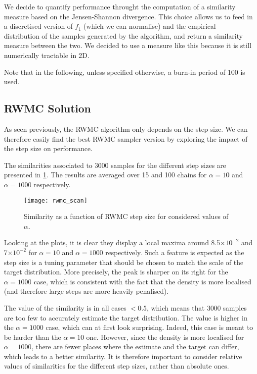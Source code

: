 \documentclass[a4paper, 12pt,oneside]{article}
\begin{document}
		We decide to quantify performance throught the computation of a similarity measure based on the Jensen-Shannon divergence. This choice allows us to feed in a discretised version of $f_1$ (which we can normalise) and the empirical distribution of the samples generated by the algorithm, and return a similarity measure between the two. We decided to use a measure like this because it is still numerically tractable in 2D.  

		Note that in the following, unless specified otherwise, a burn-in period of 100 is used. 
		\subsection{RWMC Solution}
			As seen previously, the RWMC algorithm only depends on the step size. We can therefore easily find the best RWMC sampler version by exploring the impact of the step size on performance. 

			The similarities associated to 3000 samples for the different step sizes are presented in \ref{fig:rwmc-scan}. The results are averaged over 15 and 100 chains for $\alpha=10$ and $\alpha=1000$ respectively. 
			\begin{figure}[htb]
				\centering
					\vspace{0em}
					\texttt{[image: rwmc\_scan]}
					\caption{Similarity as a function of RWMC step size for considered values of $\alpha$.}
					\label{fig:rwmc-scan}
			\end{figure}
			Looking at the plots, it is clear they display a local maxima around 8.5$\times 10^{-2}$ and 7$\times 10^{-2}$ for $\alpha=10$ and $\alpha=1000$ respectively. Such a feature is expected as the step size is a tuning parameter that should be chosen to match the scale of the target distribution.
			More precisely, the peak is sharper on its right for the $\alpha=1000$ case, which is consistent with the fact that the density is more localised (and therefore large steps are more heavily penalised). 
			
			The value of the similarity is in all cases $<0.5$, which means that 3000 samples are too few to accurately estimate the target distribution. The value is higher in the $\alpha=1000$ case, which can at first look surprising. Indeed, this case is meant to be harder than the $\alpha=10$ one. However, since the density is more localised for $\alpha=1000$, there are fewer places where the estimate and the target can differ, which leads to a better similarity. It is therefore important to consider relative values of similarities for the different step sizes, rather than  absolute ones.
\end{document}
